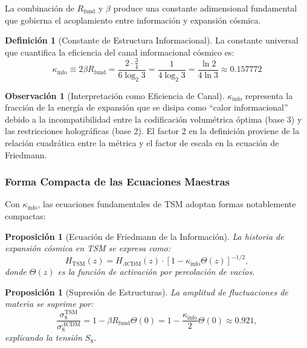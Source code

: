 \documentclass[11pt, a4paper]{article}
\theoremstyle{plain}
\newtheorem{proposicion}[teorema]{Proposición}
\theoremstyle{definition}
\newtheorem{definicion}[teorema]{Definición}
\newtheorem{observacion}[teorema]{Observación}
\newcommand{\Rfactor}{R_{\text{fund}}}
\newcommand{\Kinfo}{\kappa_{\text{info}}}
\begin{document}
La combinación de $\Rfactor$ y $\beta$ produce una constante adimensional fundamental que gobierna el acoplamiento entre información y expansión cósmica.

\begin{definicion}[Constante de Estructura Informacional]
La constante universal que cuantifica la eficiencia del canal informacional cósmico es:
\begin{equation}
\boxed{\Kinfo \equiv 2\beta\Rfactor = \frac{2 \cdot \frac{3}{4}}{6 \log_2 3} = \frac{1}{4 \log_2 3} = \frac{\ln 2}{4 \ln 3} \approx 0.157772}
\label{eq:kinfo_def}
\end{equation}
\end{definicion}

\begin{observacion}[Interpretación como Eficiencia de Canal]
$\Kinfo$ representa la fracción de la energía de expansión que se disipa como ``calor informacional'' debido a la incompatibilidad entre la codificación volumétrica óptima (base 3) y las restricciones holográficas (base 2). El factor 2 en la definición proviene de la relación cuadrática entre la métrica y el factor de escala en la ecuación de Friedmann.
\end{observacion}

\subsubsection{Forma Compacta de las Ecuaciones Maestras}

Con $\Kinfo$, las ecuaciones fundamentales de TSM adoptan formas notablemente compactas:

\begin{proposicion}[Ecuación de Friedmann de la Información]
La historia de expansión cósmica en TSM se expresa como:
\begin{equation}
H_{\text{TSM}}(z) = H_{\Lambda\text{CDM}}(z) \cdot \left[1 - \Kinfo \Theta(z)\right]^{-1/2},
\label{eq:friedmann_info}
\end{equation}
donde $\Theta(z)$ es la función de activación por percolación de vacíos.
\end{proposicion}

\begin{proposicion}[Supresión de Estructuras]
La amplitud de fluctuaciones de materia se suprime por:
\begin{equation}
\frac{\sigma_8^{\text{TSM}}}{\sigma_8^{\Lambda\text{CDM}}} = 1 - \beta\Rfactor \Theta(0) = 1 - \frac{\Kinfo}{2} \Theta(0) \approx 0.921,
\label{eq:suppression}
\end{equation}
explicando la tensión $S_8$.
\end{proposicion}
\end{document}
